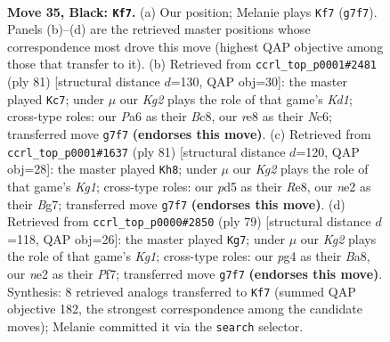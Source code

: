 \documentclass[11pt]{article}
\begin{document}
\clearpage

\begin{figure}[p]\centering
\begin{subfigure}{0.46\textwidth}\centering
\resizebox{\linewidth}{!}{%
\newchessgame
\chessboard[
  setfen={rn2R3/3n2k1/p2p1b2/3P4/6P1/q1NQ4/4N3/4K3 b - - 1 35},
  showmover=false,
  pgfstyle=straightmove, color=movearrow, markmove={g7-f7}
]}
\caption{}
\end{subfigure}\hfill
\begin{subfigure}{0.46\textwidth}\centering
\resizebox{\linewidth}{!}{%
\newchessgame
\chessboard[
  setfen={2bk4/4n3/2n1p3/3pP3/1bpP3N/6K1/1Q2N3/8 b - - 4 41},
  showmover=false,
  pgfstyle=straightmove, color=movearrow, markmove={d8-c7}
]}
\caption{}
\end{subfigure}
\\[4pt]
\begin{subfigure}{0.46\textwidth}\centering
\resizebox{\linewidth}{!}{%
\newchessgame
\chessboard[
  setfen={4r1k1/R5b1/2NQnqpp/8/8/6P1/5PB1/6K1 b - - 0 41},
  showmover=false,
  pgfstyle=straightmove, color=movearrow, markmove={g8-h8}
]}
\caption{}
\end{subfigure}\hfill
\begin{subfigure}{0.46\textwidth}\centering
\resizebox{\linewidth}{!}{%
\newchessgame
\chessboard[
  setfen={b5k1/2n2p2/3Qn1p1/q6p/2B5/4NP1P/6P1/5NK1 b - - 11 40},
  showmover=false,
  pgfstyle=straightmove, color=movearrow, markmove={g8-g7}
]}
\caption{}
\end{subfigure}
\caption{\textbf{Move 35, Black: \texttt{Kf7}.} (a) Our position; Melanie plays \texttt{Kf7} (\texttt{g7f7}). Panels (b)--(d) are the retrieved master positions whose correspondence most drove this move (highest QAP objective among those that transfer to it). (b) Retrieved from \texttt{ccrl\_top\_p0001\#2481} (ply 81) [structural distance $d$=130, QAP obj=30]: the master played \texttt{Kc7}; under $\mu$ our \emph{Kg2} plays the role of that game's \emph{Kd1}; cross-type roles: our \emph{P}a6 as their \emph{B}c8, our \emph{r}e8 as their \emph{N}c6; transferred move \texttt{g7f7} \textbf{(endorses this move)}. (c) Retrieved from \texttt{ccrl\_top\_p0001\#1637} (ply 81) [structural distance $d$=120, QAP obj=28]: the master played \texttt{Kh8}; under $\mu$ our \emph{Kg2} plays the role of that game's \emph{Kg1}; cross-type roles: our \emph{p}d5 as their \emph{R}e8, our \emph{n}e2 as their \emph{B}g7; transferred move \texttt{g7f7} \textbf{(endorses this move)}. (d) Retrieved from \texttt{ccrl\_top\_p0000\#2850} (ply 79) [structural distance $d$=118, QAP obj=26]: the master played \texttt{Kg7}; under $\mu$ our \emph{Kg2} plays the role of that game's \emph{Kg1}; cross-type roles: our \emph{p}g4 as their \emph{B}a8, our \emph{n}e2 as their \emph{P}f7; transferred move \texttt{g7f7} \textbf{(endorses this move)}. Synthesis: 8 retrieved analogs transferred to \texttt{Kf7} (summed QAP objective 182, the strongest correspondence among the candidate moves); Melanie committed it via the \texttt{search} selector.}
\label{fig:thought-m69}
\end{figure}
\end{document}
